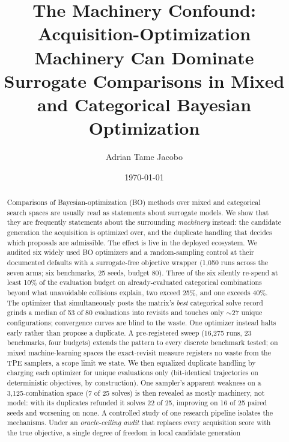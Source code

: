 \documentclass[%
 aip,
 amsmath,amssymb,
 floatfix,
 reprint,%
]{revtex4-1}
\begin{document}
\title[The Machinery Confound in Mixed-Space Bayesian Optimization]{The
Machinery Confound: Acquisition-Optimization Machinery Can Dominate Surrogate
Comparisons in Mixed and Categorical Bayesian Optimization}

\author{Adrian Tame Jacobo}

\date{\today}

\begin{abstract}
Comparisons of Bayesian-optimization (BO) methods over mixed and categorical
search spaces are usually read as statements about surrogate models. We show
that they are frequently statements about the surrounding \emph{machinery}
instead: the candidate generation the acquisition is optimized over, and the
duplicate handling that decides which proposals are admissible. The effect is
live in the deployed ecosystem.
We audited six widely used BO optimizers and a random-sampling control at
their documented defaults with a surrogate-free objective wrapper (1{,}050
runs across the seven arms; six benchmarks, 25 seeds, budget 80). Three of
the six silently re-spend at least 10\% of the evaluation budget on
already-evaluated categorical combinations beyond what unavoidable collisions
explain, two exceed 25\%, and one exceeds 40\%. The optimizer that
simultaneously posts the matrix's \emph{best} categorical solve record
grinds a median of 53 of 80 evaluations into revisits and touches only
${\sim}27$ unique configurations; convergence curves are blind to the waste.
One optimizer instead halts early rather than propose a duplicate.
A pre-registered sweep (16{,}275 runs, 23 benchmarks, four budgets)
extends the pattern to every discrete benchmark tested; on mixed
machine-learning spaces the exact-revisit measure registers no waste from
the TPE samplers, a scope limit we state.
We then equalized duplicate handling by charging each optimizer for unique
evaluations only (bit-identical trajectories on deterministic objectives, by
construction). One sampler's apparent weakness on a 3{,}125-combination
space (7 of 25 solves) is then revealed as mostly machinery, not model: with
its duplicates refunded it solves 22 of 25, improving on 16 of 25 paired
seeds and worsening on none.
A controlled study of one research pipeline isolates the mechanisms. Under
an \emph{oracle-ceiling audit} that replaces every acquisition score with
the true objective, a single degree of freedom in local candidate generation

\end{abstract}
\end{document}
